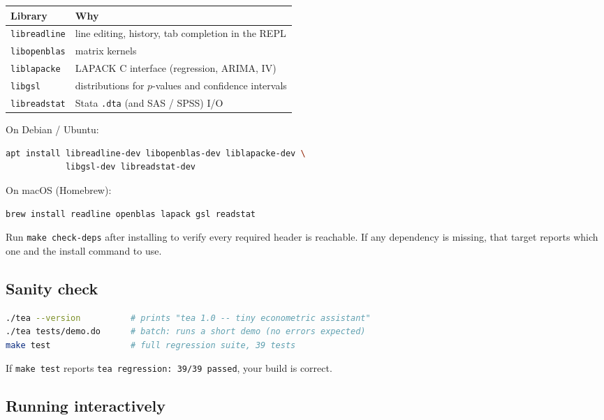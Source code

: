 \documentclass[11pt,letterpaper]{article}
\begin{document}
\begin{center}
\begin{tabular}{ll}
\toprule
Library & Why \\
\midrule
\texttt{libreadline} & line editing, history, tab completion in the REPL \\
\texttt{libopenblas} & matrix kernels \\
\texttt{liblapacke} & LAPACK C interface (regression, ARIMA, IV) \\
\texttt{libgsl} & distributions for $p$-values and confidence intervals \\
\texttt{libreadstat} & Stata \texttt{.dta} (and SAS / SPSS) I/O \\
\bottomrule
\end{tabular}
\end{center}

On Debian / Ubuntu:

\begin{lstlisting}[language=bash]
apt install libreadline-dev libopenblas-dev liblapacke-dev \
            libgsl-dev libreadstat-dev
\end{lstlisting}

On macOS (Homebrew):

\begin{lstlisting}[language=bash]
brew install readline openblas lapack gsl readstat
\end{lstlisting}

Run \texttt{make check-deps} after installing to verify every required
header is reachable.  If any dependency is missing, that target reports
which one and the install command to use.

\subsection{Sanity check}

\begin{lstlisting}[language=bash]
./tea --version          # prints "tea 1.0 -- tiny econometric assistant"
./tea tests/demo.do      # batch: runs a short demo (no errors expected)
make test                # full regression suite, 39 tests
\end{lstlisting}

If \texttt{make test} reports \texttt{tea regression: 39/39 passed},
your build is correct.

\subsection{Running interactively}
\end{document}
